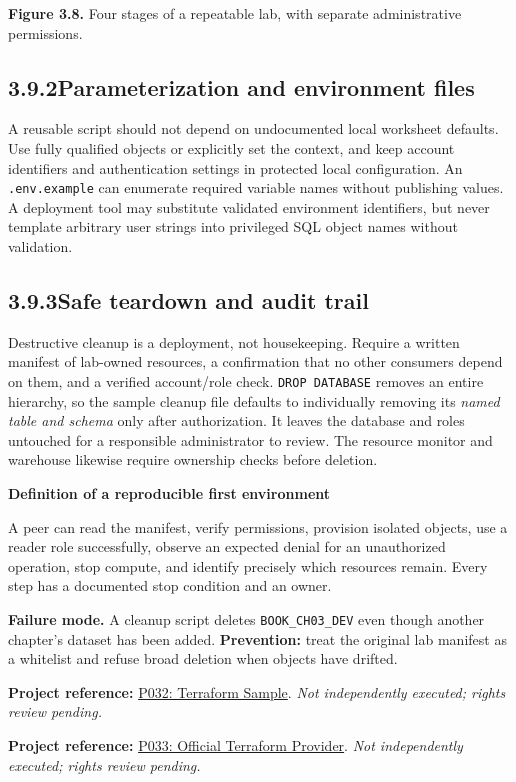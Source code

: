 \documentclass[11pt,twoside]{article}
\newcommand{\topic}[2]{\subsection*{#1\quad #2}}
\newcommand{\repo}[2]{\par\begingroup\fontsize{8.0}{9.6}\selectfont\sffamily\color{inkgray}\textbf{Project reference:} \href{#2}{#1}. \textit{Not independently executed; rights review pending.}\par\endgroup}
\begin{document}
\begin{center}
\end{center}
{\small\color{inkgray}\textbf{Figure 3.8.} Four stages of a repeatable lab, with separate administrative permissions.}\par
\topic{3.9.2}{Parameterization and environment files}
A reusable script should not depend on undocumented local worksheet defaults. Use fully qualified objects or explicitly set the context, and keep account identifiers and authentication settings in protected local configuration. An \texttt{.env.example} can enumerate required variable names without publishing values. A deployment tool may substitute validated environment identifiers, but never template arbitrary user strings into privileged SQL object names without validation.

\topic{3.9.3}{Safe teardown and audit trail}
Destructive cleanup is a deployment, not housekeeping. Require a written manifest of lab-owned resources, a confirmation that no other consumers depend on them, and a verified account/role check. \texttt{DROP DATABASE} removes an entire hierarchy, so the sample cleanup file defaults to individually removing its \emph{named table and schema} only after authorization. It leaves the database and roles untouched for a responsible administrator to review. The resource monitor and warehouse likewise require ownership checks before deletion.

\begin{whitebox}
\textbf{Definition of a reproducible first environment}\par
A peer can read the manifest, verify permissions, provision isolated objects, use a reader role successfully, observe an expected denial for an unauthorized operation, stop compute, and identify precisely which resources remain. Every step has a documented stop condition and an owner.
\end{whitebox}
\textbf{Failure mode.} A cleanup script deletes \texttt{BOOK\_CH03\_DEV} even though another chapter's dataset has been added. \textbf{Prevention:} treat the original lab manifest as a whitelist and refuse broad deletion when objects have drifted.
\repo{P032: Terraform Sample}{https://github.com/Snowflake-Labs/sfguide-terraform-sample}
\repo{P033: Official Terraform Provider}{https://github.com/snowflakedb/terraform-provider-snowflake}
\end{document}
